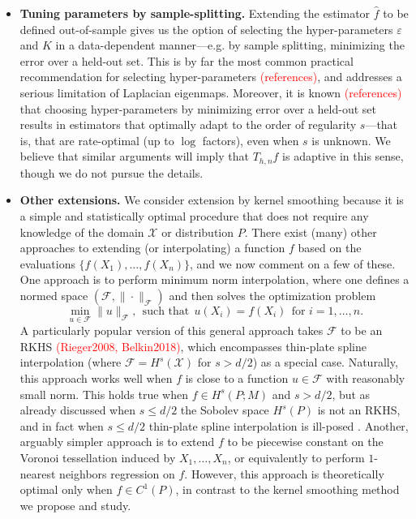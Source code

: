 \documentclass{article}
\newcommand{\1}{\mathbf{1}}
\newcommand{\mc}[1]{\mathcal{#1}}
\newcommand{\wh}[1]{\widehat{#1}}
\theoremstyle{alden}
\theoremstyle{aldenthm}
\theoremstyle{definition}
\theoremstyle{remark}
\begin{document}
\begin{itemize}
	\item \textbf{Tuning parameters by sample-splitting.} Extending the estimator $\wh{f}$ to be defined out-of-sample gives us the option of selecting the hyper-parameters $\varepsilon$ and $K$ in a data-dependent manner---e.g. by sample splitting, minimizing the error over a held-out set. This is by far the most common practical recommendation for selecting hyper-parameters \textcolor{red}{(references)}, and addresses a serious limitation of Laplacian eigenmaps. Moreover, it is known \textcolor{red}{(references)} that choosing hyper-parameters by minimizing error over a held-out set results in estimators that optimally adapt to the order of regularity $s$---that is, that are rate-optimal (up to $\log$ factors), even when $s$ is unknown. We believe that similar arguments will imply that $T_{h,n}\wh{f}$ is adaptive in this sense, though we do not pursue the details.
	\item \textbf{Other extensions.} We consider extension by kernel smoothing because it is a simple and statistically optimal procedure that does not require any knowledge of the domain $\mc{X}$ or distribution $P$. There exist (many) other approaches to extending (or interpolating) a function $f$ based on the evaluations $\{f(X_1),\ldots,f(X_n)\}$, and we now comment on a few of these. One approach is to perform minimum norm interpolation, where one defines a normed space $(\mc{F},\|\cdot\|_{\mc{F}})$ and then solves the optimization problem
	\begin{equation*}
	\min_{u \in \mc{F}} \|u\|_{\mc{F}},~~\textrm{such that}~~ u(X_i) =  f(X_i)~~\textrm{for $i = 1,\ldots,n$.}
	\end{equation*}
	A particularly popular version of this general approach takes $\mc{F}$ to be an RKHS \textcolor{red}{(Rieger2008, Belkin2018)}, which encompasses thin-plate spline interpolation (where $\mc{F} = H^s(\mc{X})$ for $s > d/2$) as a special case. Naturally, this approach works well when $f$ is close to a function $u \in \mc{F}$ with reasonably small norm.  This holds true when $f \in H^s(P;M)$ and $s > d/2$, but as already discussed when $s \leq d/2$ the Sobolev space $H^s(P)$ is not an RKHS, and in fact when $s \leq d/2$ thin-plate spline interpolation is ill-posed \citep{green93}. Another, arguably simpler approach is to extend $f$ to be piecewise constant on the Voronoi tessellation induced by $X_1,\ldots,X_n$, or equivalently to perform $1$-nearest neighbors regression on $f$. However, this approach is theoretically optimal only when $f \in C^1(P)$, in contrast to the kernel smoothing method we propose and study.

\end{itemize}
\end{document}

